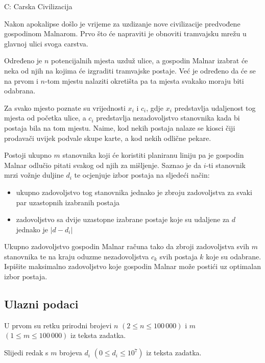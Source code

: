 \begin{statement}[
  timelimit=1.5 s,
  memorylimit=512 MiB,
]{C: Carska Civilizacija}

Nakon apokalipse došlo je vrijeme za uzdizanje nove civilizacije predvođene
gospodinom Malnarom. Prvo što će napraviti je obnoviti tramvajsku mrežu u
glavnoj ulici svoga carstva.

Određeno je $n$ potencijalnih mjesta uzduž ulice, a gospodin Malnar izabrat će
neka od njih na kojima će izgraditi tramvajske postaje. Već je određeno da će
se na prvom i $n$-tom mjestu nalaziti okretišta pa ta mjesta svakako moraju
biti odabrana.

Za svako mjesto poznate su vrijednosti $x_i$ i $c_i$, gdje $x_i$ predstavlja
udaljenost tog mjesta od početka ulice, a $c_i$ predstavlja nezadovoljstvo
stanovnika kada bi postaja bila na tom mjestu. Naime, kod nekih postaja
nalaze se kiosci čiji prodavači uvijek podvale skupe karte, a kod nekih
odlične pekare.

Postoji ukupno $m$ stanovnika koji će koristiti planiranu liniju pa je gospodin
Malnar odlučio pitati svakog od njih za mišljenje. Saznao je da $i$-ti
stanovnik mrzi vožnje duljine $d_i$ te ocjenjuje izbor postaja na sljedeći
način:

\begin{itemize}
    \item ukupno zadovoljstvo tog stanovnika jednako je zbroju zadovoljstva za
          svaki par uzastopnih izabranih postaja
    \item zadovoljstvo sa dvije uzastopne izabrane postaje koje su udaljene za
          $d$ jednako je $|d - d_i|$
\end{itemize}

Ukupno zadovoljstvo gospodin Malnar računa tako da zbroji zadovoljstva svih $m$
stanovnika te na kraju oduzme nezadovoljstva $c_k$ svih postaja $k$ koje su
odabrane. Ispišite maksimalno zadovoljstvo koje gospodin Malnar može postići
uz optimalan izbor postaja.

\subsection*{Ulazni podaci}
 U prvom su retku prirodni brojevi $n$ $(2 \le n \le 100\,000)$ i $m$
$(1 \le m \le 100\,000)$ iz teksta zadatka.

Slijedi redak s $m$ brojeva $d_i$ $(0 \le d_i \le 10^7)$ iz teksta zadatka.


\end{statement}
